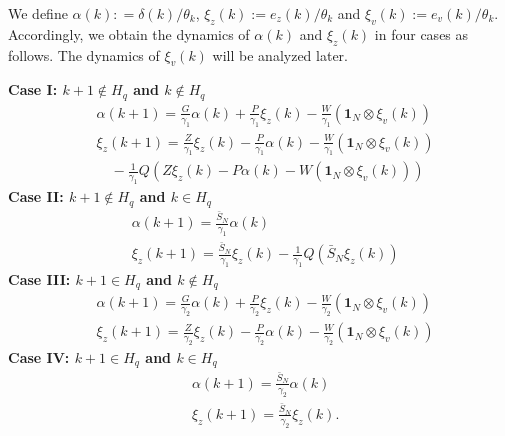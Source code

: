 \documentclass{autart}
\begin{document}
%
We define $\alpha(k) : = \delta(k)/\theta_k$, $\xi_z(k) := e_z(k)/\theta_k$ and $\xi_v(k) := e_v(k)/\theta_k$. Accordingly, we obtain the dynamics of $\alpha(k)$ and $\xi_z(k)$ in four cases as follows. The dynamics of $\xi_v(k)$ will be analyzed later. 

\textbf{Case I: $k+1\notin H_q$ and $k\notin H_q$}
\begin{subequations}\label{35}
	\begin{align}
	&\!\!\!\! \alpha( k+1 )=  \frac{G}{\gamma_1} \alpha (k) + \frac{P}{\gamma_1}  \xi_z(k)  - \frac{W}{\gamma_1} (\mathbf 1_N \otimes \xi_v(k)) \\
	&\!\!\!\!  \xi_z( k+1 ) = \frac{Z}{\gamma_1} \xi _z (k)  -  \frac{P}{\gamma_1} \alpha(k)   - \frac{W}{\gamma_1} (\mathbf 1_N \otimes \xi_v(k)) \nonumber\\
	& \quad   -    \frac{1}{\gamma_1} Q\left(Z \xi_z(k)  -  P \alpha(k)   - W (\mathbf 1_N \otimes \xi_v(k))\right)  
	\end{align}
\end{subequations}
\textbf{Case II: $k + 1\notin H_q$ and $k\in H_q$}
\begin{subequations}
	\begin{align}
	&\alpha( k+1 )=  \frac{\bar S_N }{\gamma_1} \alpha (k)  \\
	&\xi_z ( k+1 ) = \frac{\bar S_N }{\gamma_1} \xi_z(k)  -  \frac{1}{\gamma_1} Q\left( \bar S_N \xi_z(k) \right) 
	\end{align}	
\end{subequations}
\textbf{Case III: $k+1\in H_q$ and $k\notin H_q$}
\begin{subequations}
	\begin{align}
	&\!\!\!\! \alpha( k+1 )=  \frac{G}{\gamma_2} \alpha (k) + \frac{P}{\gamma_2}  \xi_z(k)  - \frac{W}{\gamma_2} (\mathbf 1_N \otimes \xi_v(k)) \\
	&\!\!\!\! \xi _z ( k+1 ) = \frac{Z}{\gamma_2} \xi_z(k)  -  \frac{P}{\gamma_2} \alpha(k)   - \frac{W}{\gamma_2} (\mathbf 1_N \otimes \xi_v(k)) 
	\end{align}	
\end{subequations}
\textbf{Case IV: $k +1 \in H_q$ and $k\in H_q$}
\begin{subequations}\label{33}
	\begin{align}
	&\alpha( k+1 )=  \frac{\bar S _N }{\gamma_2} \alpha (k)  \\
	&\xi_z ( k+1 ) = \frac{\bar S _N}{\gamma_2} \xi_z(k).  
	\end{align}
\end{subequations}
\end{document}
